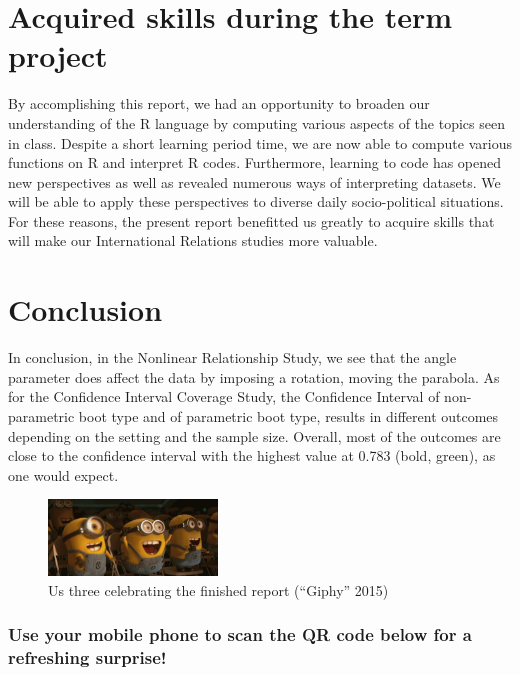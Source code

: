 \documentclass[11pt,]{article}
\begin{document}
\hypertarget{acquired-skills-during-the-term-project}{%
\section{Acquired skills during the term
project}\label{acquired-skills-during-the-term-project}}

By accomplishing this report, we had an opportunity to broaden our
understanding of the R language by computing various aspects of the
topics seen in class. Despite a short learning period time, we are now
able to compute various functions on R and interpret R codes.
Furthermore, learning to code has opened new perspectives as well as
revealed numerous ways of interpreting datasets. We will be able to
apply these perspectives to diverse daily socio-political situations.
For these reasons, the present report benefitted us greatly to acquire
skills that will make our International Relations studies more valuable.

\hypertarget{conclusion}{%
\section{Conclusion}\label{conclusion}}

In conclusion, in the Nonlinear Relationship Study, we see that the
angle parameter does affect the data by imposing a rotation, moving the
parabola. As for the Confidence Interval Coverage Study, the Confidence
Interval of non-parametric boot type and of parametric boot type,
results in different outcomes depending on the setting and the sample
size. Overall, most of the outcomes are close to the confidence interval
with the highest value at 0.783 (bold, green), as one would expect.

\begin{figure}
\centering
\includegraphics[width=0.4\textwidth,height=\textheight]{cheering_minions.png}
\caption{Us three celebrating the finished report (``Giphy'' 2015)}
\end{figure}

\hypertarget{use-your-mobile-phone-to-scan-the-qr-code-below-for-a-refreshing-surprise}{%
\subsubsection{Use your mobile phone to scan the QR code below for a
refreshing
surprise!}\label{use-your-mobile-phone-to-scan-the-qr-code-below-for-a-refreshing-surprise}}
\end{document}
